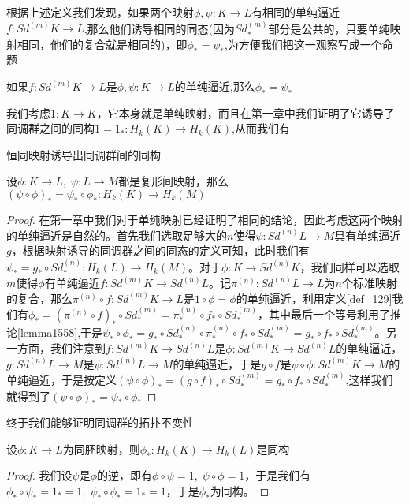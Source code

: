 根据上述定义我们发现，如果两个映射$\phi,\psi:K\rightarrow L$有相同的单纯逼近$f:Sd^{(m)}K\rightarrow L$,那么他们诱导相同的同态(因为$Sd_{*}^{(m)}$部分是公共的，只要单纯映射相同，他们的复合就是相同的)，即$\phi_{*}=\psi_{*}$,为方便我们把这一观察写成一个命题
\begin{proposition}\label{pro_2_133}
如果$f:Sd^{(m)}K\rightarrow L$是$\phi,\psi:K\rightarrow L$的单纯逼近,那么$\phi_{*}=\psi_{*}$
\end{proposition}
我们考虑$1:K\rightarrow K$，它本身就是单纯映射，而且在第一章中我们证明了它诱导了同调群之间的同构$1=1_{*}:H_{k}(K)\rightarrow H_{k}(K)$,从而我们有
\begin{proposition}\label{pro_2_143}
    恒同映射诱导出同调群间的同构
\end{proposition}
\begin{proposition}\label{pro_2_146}
    设$\phi:K\rightarrow L,\;\psi:L\rightarrow M$都是复形间映射，那么$(\psi\circ \phi)_{*}=\psi_{*}\circ \phi_{*}:H_{k}(K)\rightarrow H_{k}(M)$
\end{proposition}
\begin{proof}
在第一章中我们对于单纯映射已经证明了相同的结论，因此考虑这两个映射的单纯逼近是自然的。首先我们选取足够大的$n$使得$\psi:Sd^{(n)}L\rightarrow M$具有单纯逼近$g$，根据映射诱导的同调群之间的同态的定义可知，此时我们有$\psi_{*}=g_{*}\circ Sd^{(n)}_{*}:H_{k}(L)\rightarrow H_{k}(M)$。对于$\phi:K\rightarrow Sd^{(n)}K$，我们同样可以选取$m$使得$\phi$有单纯逼近$f:Sd^{(m)}K\rightarrow Sd^{(n)}L$。记$\pi^{(n)}:Sd^{(n)}L\rightarrow L$为$n$个标准映射的复合，那么$\pi^{(n)}\circ f:Sd^{(m)}K\rightarrow L$是$1\circ \phi=\phi$的单纯逼近，利用定义\eqref{def_129}我们有$\phi_{*}=(\pi^{(n)}\circ f)_{*}\circ Sd_{*}^{(m)}=\pi^{(n)}_{*}\circ f_{*}\circ Sd_{*}^{(m)}$，其中最后一个等号利用了推论\eqref{lemma1558},于是$\psi_{*}\circ \phi_{*}=g_{*}\circ Sd^{(n)}_{*}\circ\pi^{(n)}_{*}\circ f_{*}\circ Sd_{*}^{(m)}=g_{*}\circ f_{*}\circ Sd_{*}^{(m)}$。另一方面，我们注意到$f:Sd^{(m)}K\rightarrow Sd^{(n)}L$是$\phi:Sd^{(m)}K\rightarrow Sd^{(n)}L$的单纯逼近，$g:Sd^{(n)}L\rightarrow M$是$\psi:Sd^{(n)}L\rightarrow M$的单纯逼近，于是$g\circ f$是$\psi\circ \phi:Sd^{(m)}K\rightarrow M$的单纯逼近，于是按定义$(\psi\circ\phi)_{*}=(g\circ f)_{*}\circ Sd_{*}^{(m)}=g_{*}\circ f_{*}\circ Sd_{*}^{(m)}$,这样我们就得到了$(\psi\circ\phi)_{*}=\psi_{*}\circ\phi_{*}$
\end{proof}
终于我们能够证明同调群的拓扑不变性
\begin{theorem}[同调群的拓扑不变性]
设$\phi:K\rightarrow L$为同胚映射，则$\phi_{*}:H_{k}(K)\rightarrow H_{k}(L)$是同构
\end{theorem}
\begin{proof}
我们设$\psi$是$\phi$的逆，即有$\phi\circ\psi=1,\;\psi\circ\phi=1$，于是我们有$\phi_{*}\circ\psi_{*}=1_{*}=1,\;\psi_{*}\circ\phi_{*}=1_{*}=1$，于是$\phi_{*}$为同构。
\end{proof}
